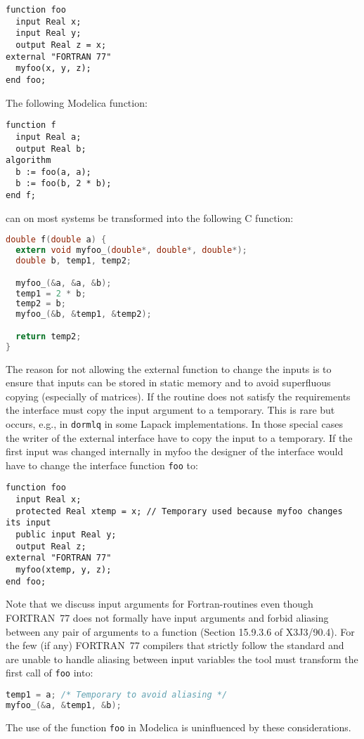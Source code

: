 \begin{example}
\begin{lstlisting}[language=modelica]
function foo
  input Real x;
  input Real y;
  output Real z = x;
external "FORTRAN 77"
  myfoo(x, y, z);
end foo;
\end{lstlisting}
The following Modelica function:
\begin{lstlisting}[language=modelica]
function f
  input Real a;
  output Real b;
algorithm
  b := foo(a, a);
  b := foo(b, 2 * b);
end f;
\end{lstlisting}
can on most systems be transformed into the following C function:
\begin{lstlisting}[language=C]
double f(double a) {
  extern void myfoo_(double*, double*, double*);
  double b, temp1, temp2;

  myfoo_(&a, &a, &b);
  temp1 = 2 * b;
  temp2 = b;
  myfoo_(&b, &temp1, &temp2);

  return temp2;
}
\end{lstlisting}

The reason for not allowing the external function to change the inputs is to ensure that inputs can be stored in static memory and to avoid superfluous copying (especially of matrices).
If the routine does not satisfy the requirements the interface must copy the input argument to a temporary.
This is rare but occurs, e.g., in {\lstinline!dormlq!} in some Lapack implementations.
In those special cases the writer of the external interface have to copy the input to a temporary.
If the first input was changed internally in myfoo the designer of the interface would have to change the interface function {\lstinline!foo!} to:
\begin{lstlisting}[language=modelica]
function foo
  input Real x;
  protected Real xtemp = x; // Temporary used because myfoo changes its input
  public input Real y;
  output Real z;
external "FORTRAN 77"
  myfoo(xtemp, y, z);
end foo;
\end{lstlisting}

Note that we discuss input arguments for Fortran-routines even though FORTRAN~77 does not formally have input arguments and forbid aliasing between any pair of arguments to a function (Section 15.9.3.6 of X3J3/90.4).
For the few (if any) FORTRAN~77 compilers that strictly follow the standard and are unable to handle aliasing between input variables the tool must transform the first call of {\lstinline!foo!} into:
\begin{lstlisting}[language=C]
temp1 = a; /* Temporary to avoid aliasing */
myfoo_(&a, &temp1, &b);
\end{lstlisting}

The use of the function {\lstinline!foo!} in Modelica is uninfluenced by these considerations.
\end{example}

